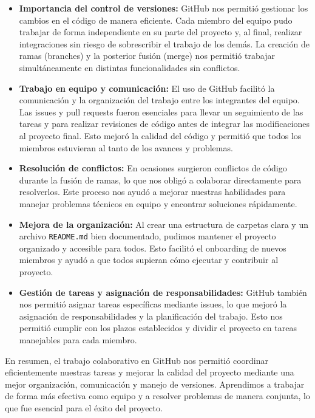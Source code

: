 \documentclass{article}
\begin{document}
    \begin{itemize}
        \item \textbf{Importancia del control de versiones:} GitHub nos permitió gestionar los cambios en el código de manera eficiente. Cada miembro del equipo pudo trabajar de forma independiente en su parte del proyecto y, al final, realizar integraciones sin riesgo de sobrescribir el trabajo de los demás. La creación de ramas (branches) y la posterior fusión (merge) nos permitió trabajar simultáneamente en distintas funcionalidades sin conflictos.
        
        \item \textbf{Trabajo en equipo y comunicación:} El uso de GitHub facilitó la comunicación y la organización del trabajo entre los integrantes del equipo. Las issues y pull requests fueron esenciales para llevar un seguimiento de las tareas y para realizar revisiones de código antes de integrar las modificaciones al proyecto final. Esto mejoró la calidad del código y permitió que todos los miembros estuvieran al tanto de los avances y problemas.
    
        \item \textbf{Resolución de conflictos:} En ocasiones surgieron conflictos de código durante la fusión de ramas, lo que nos obligó a colaborar directamente para resolverlos. Este proceso nos ayudó a mejorar nuestras habilidades para manejar problemas técnicos en equipo y encontrar soluciones rápidamente.
    
        \item \textbf{Mejora de la organización:} Al crear una estructura de carpetas clara y un archivo \texttt{README.md} bien documentado, pudimos mantener el proyecto organizado y accesible para todos. Esto facilitó el onboarding de nuevos miembros y ayudó a que todos supieran cómo ejecutar y contribuir al proyecto.
        
        \item \textbf{Gestión de tareas y asignación de responsabilidades:} GitHub también nos permitió asignar tareas específicas mediante issues, lo que mejoró la asignación de responsabilidades y la planificación del trabajo. Esto nos permitió cumplir con los plazos establecidos y dividir el proyecto en tareas manejables para cada miembro.
    \end{itemize}
    
    En resumen, el trabajo colaborativo en GitHub nos permitió coordinar eficientemente nuestras tareas y mejorar la calidad del proyecto mediante una mejor organización, comunicación y manejo de versiones. Aprendimos a trabajar de forma más efectiva como equipo y a resolver problemas de manera conjunta, lo que fue esencial para el éxito del proyecto.
\end{document}

